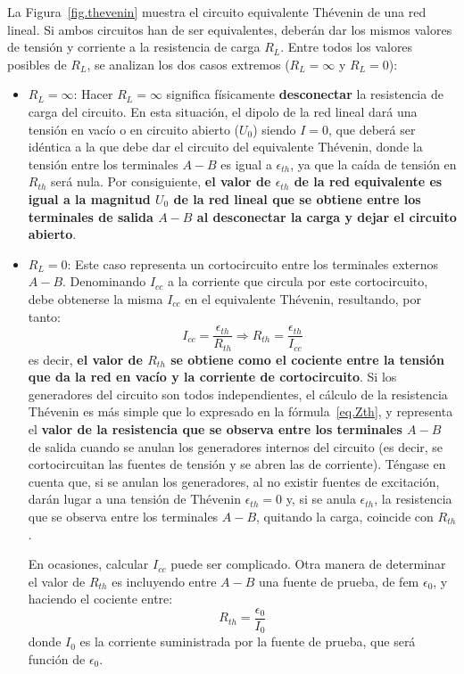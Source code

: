      La Figura~\ref{fig.thevenin} muestra el circuito equivalente Thévenin de una red lineal. Si ambos circuitos han de ser equivalentes, deberán dar los mismos valores de tensión y corriente a la resistencia de carga $R_L$. Entre todos los valores posibles de $R_L$, se analizan los dos casos extremos ($R_L=\infty$ y $R_L=0$):
     \begin{itemize}
         \item $R_L=\infty$: Hacer $R_L=\infty$ significa físicamente \textbf{desconectar} la resistencia de carga del circuito. En esta situación, el dipolo de la red lineal dará una tensión en vacío o en circuito abierto ($U_0$) siendo $I=0$, que deberá ser idéntica a la que debe dar el circuito del equivalente Thévenin, donde la tensión entre los terminales $A-B$ es igual a $\epsilon_{th}$, ya que la caída de tensión en $R_{th}$ será nula. Por consiguiente, \textbf{el valor de $\epsilon_{th}$ de la red equivalente es igual a la magnitud $U_0$ de la red lineal que se obtiene entre los terminales de salida $A-B$ al desconectar la carga y dejar el circuito abierto}.
         \item $R_L=0$: Este caso representa un cortocircuito entre los terminales externos $A-B$. Denominando $I_{cc}$ a la corriente que circula por este cortocircuito, debe obtenerse la misma $I_{cc}$ en el equivalente Thévenin, resultando, por tanto:
         \begin{equation}\label{eq.Zth} I_{cc}=\dfrac{\epsilon_{th}}{R_{th}}\Rightarrow \boxed{R_{th}=\dfrac{\epsilon_{th}}{I_{cc}}}
         \end{equation}
         es decir, \textbf{el valor de $R_{th}$ se obtiene como el cociente entre la tensión que da la red en vacío y la corriente de cortocircuito}. Si los generadores del circuito son todos independientes, el cálculo de la resistencia Thévenin es más simple que lo expresado en la fórmula~\eqref{eq.Zth}, y representa el \textbf{valor de la resistencia que se observa entre los terminales $A-B$} de salida cuando se anulan los generadores internos del circuito (es decir, se cortocircuitan las fuentes de tensión y se abren las de corriente). Téngase en cuenta que, si se anulan los generadores, al no existir fuentes de excitación, darán lugar a una tensión de Thévenin $\epsilon_{th}=0$ y, si se anula $\epsilon_{th}$, la resistencia que se observa entre los terminales $A-B$, quitando la carga, coincide con $R_{th}$. 
         \begin{remark}
             En ocasiones, calcular $I_{cc}$ puede ser complicado. Otra manera de determinar el valor de $R_{th}$  es incluyendo entre $A-B$ una fuente de prueba, de fem $\epsilon_0$, y haciendo el cociente entre:
             \begin{equation*}
                 R_{th}=\dfrac{\epsilon_0}{I_{0}}
             \end{equation*}
             donde $I_{0}$ es la corriente suministrada por la fuente de prueba, que será función de $\epsilon_0$.
         \end{remark}
     \end{itemize}
     
